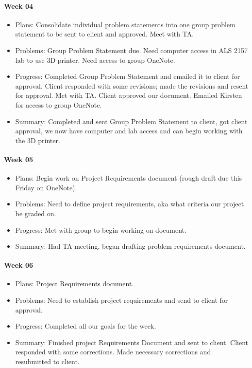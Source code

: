\paragraph{Week 04}
\begin{itemize}
\item Plans: Consolidate individual problem statements into one group problem statement to be sent to client and approved.
Meet with TA.
\item Problems: Group Problem Statement due.
Need computer access in ALS 2157 lab to use 3D printer.
Need access to group OneNote.
\item Progress: Completed Group Problem Statement and emailed it to client for approval.
Client responded  with some revisions; made the revisions and resent for approval.
Met with TA.
Client approved our document.
Emailed Kirsten for access to group OneNote.
\item Summary: Completed and sent Group Problem Statement to client, got client approval, we now have computer and lab access and can begin working with the 3D printer.
\end{itemize}
\paragraph{Week 05}
\begin{itemize}
\item Plans: Begin work on Project Requirements document (rough draft due this Friday on OneNote).
\item Problems:  Need to define project requirements, aka what criteria our project be graded on.
\item Progress: Met with group to begin working on document.
\item Summary:  Had TA meeting, began drafting problem requirements document.
\end{itemize}
\paragraph{Week 06}
\begin{itemize}
\item Plans: Project Requirements document.
\item Problems: Need to establish project requirements and send to client for approval.
\item Progress: Completed all our goals for the week.
\item Summary: Finished project Requirements Document and sent to client. 
Client responded with some corrections. 
Made necessary corrections and resubmitted to client.
\end{itemize}
